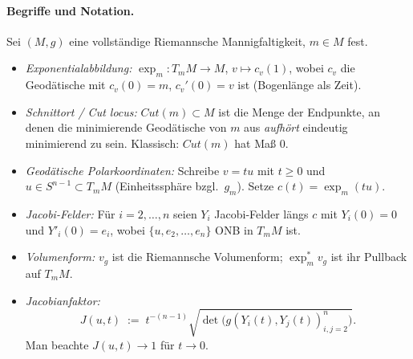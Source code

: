 \documentclass[10pt, letterpaper]{article}
\begin{document}
\paragraph*{Begriffe und Notation.}
Sei $(M,g)$ eine vollständige Riemannsche Mannigfaltigkeit, $m\in M$ fest.
\begin{itemize}
  \item \emph{Exponentialabbildung:} $\exp_m:T_mM\to M$, $v\mapsto c_v(1)$, wobei $c_v$ die Geodätische mit $c_v(0)=m$, $c_v'(0)=v$ ist (Bogenlänge als Zeit).
  \item \emph{Schnittort / Cut locus:} $Cut(m)\subset M$ ist die Menge der Endpunkte, an denen die minimierende Geodätische von $m$ aus \emph{aufhört} eindeutig minimierend zu sein. Klassisch: $Cut(m)$ hat Maß $0$.
  \item \emph{Geodätische Polarkoordinaten:} Schreibe $v=tu$ mit $t\ge 0$ und $u\in S^{n-1}\subset T_mM$ (Einheitssphäre bzgl.\ $g_m$). Setze $c(t)=\exp_m(tu)$.
  \item \emph{Jacobi-Felder:} Für $i=2,\dots,n$ seien $Y_i$ Jacobi-Felder längs $c$ mit $Y_i(0)=0$ und $Y'_i(0)=e_i$, wobei $\{u,e_2,\dots,e_n\}$ ONB in $T_mM$ ist.
  \item \emph{Volumenform:} $v_g$ ist die Riemannsche Volumenform; $\exp_m^*v_g$ ist ihr Pullback auf $T_mM$.
  \item \emph{Jacobianfaktor:}
  \[
    J(u,t)\;:=\;t^{-(n-1)}\sqrt{\det\big(g(Y_i(t),Y_j(t))_{i,j=2}^{n}\big)}.
  \]
  Man beachte $J(u,t)\to 1$ für $t\to 0$.
\end{itemize}

\end{document}
